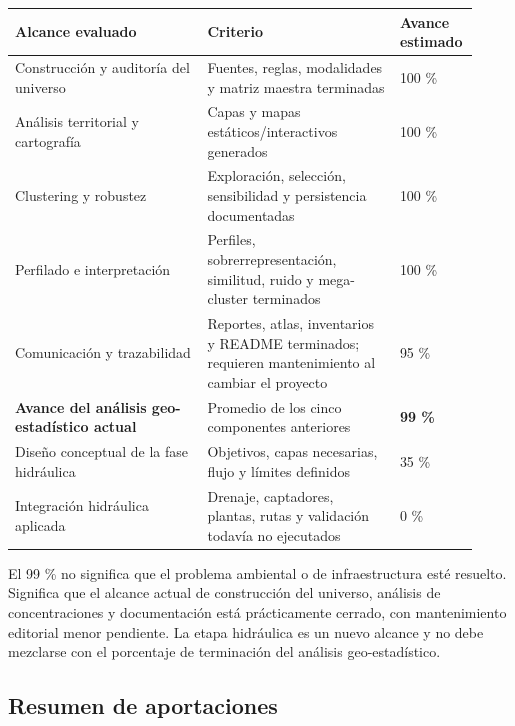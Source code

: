 \documentclass[
  spanish,
]{article}
\newcounter{none} %
\begin{document}
{\def\LTcaptype{none} %
\begin{longtable}[]{@{}p{0.40\linewidth}p{0.40\linewidth}p{0.12\linewidth}@{}}
\toprule\noalign{}
Alcance evaluado & Criterio & Avance estimado \\
\midrule\noalign{}
\endhead
\bottomrule\noalign{}
\endlastfoot
Construcción y auditoría del universo & Fuentes, reglas, modalidades y
matriz maestra terminadas & 100 \% \\
Análisis territorial y cartografía & Capas y mapas
estáticos/interactivos generados & 100 \% \\
Clustering y robustez & Exploración, selección, sensibilidad y
persistencia documentadas & 100 \% \\
Perfilado e interpretación & Perfiles, sobrerrepresentación, similitud,
ruido y mega-cluster terminados & 100 \% \\
Comunicación y trazabilidad & Reportes, atlas, inventarios y README
terminados; requieren mantenimiento al cambiar el proyecto & 95 \% \\
\textbf{Avance del análisis geo-estadístico actual} & Promedio de los
cinco componentes anteriores & \textbf{99 \%} \\
Diseño conceptual de la fase hidráulica & Objetivos, capas necesarias,
flujo y límites definidos & 35 \% \\
Integración hidráulica aplicada & Drenaje, captadores, plantas, rutas y
validación todavía no ejecutados & 0 \% \\
\end{longtable}
}

El 99 \% no significa que el problema ambiental o de infraestructura
esté resuelto. Significa que el alcance actual de construcción del
universo, análisis de concentraciones y documentación está prácticamente
cerrado, con mantenimiento editorial menor pendiente. La etapa
hidráulica es un nuevo alcance y no debe mezclarse con el porcentaje de
terminación del análisis geo-estadístico.

\subsection{Resumen de aportaciones}\label{resumen-de-aportaciones}
\end{document}
